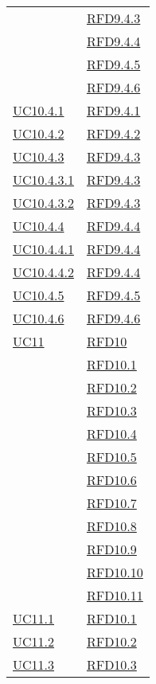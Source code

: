 \begin{longtable}{|>{\centering}m{5cm}|m{5cm}<{\centering}|}
& \hyperlink{RFD9.4.3}{RFD9.4.3}\\
& \hyperlink{RFD9.4.4}{RFD9.4.4}\\
& \hyperlink{RFD9.4.5}{RFD9.4.5}\\
& \hyperlink{RFD9.4.6}{RFD9.4.6}\\ \hline
\hyperref[UC10.4.1]{UC10.4.1} & \hyperlink{RFD9.4.1}{RFD9.4.1}\\ \hline
\hyperref[UC10.4.2]{UC10.4.2} & \hyperlink{RFD9.4.2}{RFD9.4.2}\\ \hline
\hyperref[UC10.4.3]{UC10.4.3} & \hyperlink{RFD9.4.3}{RFD9.4.3}\\ \hline
\hyperref[UC10.4.3.1]{UC10.4.3.1} & \hyperlink{RFD9.4.3}{RFD9.4.3}\\ \hline
\hyperref[UC10.4.3.2]{UC10.4.3.2} & \hyperlink{RFD9.4.3}{RFD9.4.3}\\ \hline
\hyperref[UC10.4.4]{UC10.4.4} & \hyperlink{RFD9.4.4}{RFD9.4.4}\\ \hline
\hyperref[UC10.4.4.1]{UC10.4.4.1} & \hyperlink{RFD9.4.4}{RFD9.4.4}\\ \hline
\hyperref[UC10.4.4.2]{UC10.4.4.2} & \hyperlink{RFD9.4.4}{RFD9.4.4}\\ \hline
\hyperref[UC10.4.5]{UC10.4.5} & \hyperlink{RFD9.4.5}{RFD9.4.5}\\ \hline
\hyperref[UC10.4.6]{UC10.4.6} & \hyperlink{RFD9.4.6}{RFD9.4.6}\\ \hline
\hyperref[UC11]{UC11} & \hyperlink{RFD10}{RFD10}\\
& \hyperlink{RFD10.1}{RFD10.1}\\
& \hyperlink{RFD10.2}{RFD10.2}\\
& \hyperlink{RFD10.3}{RFD10.3}\\
& \hyperlink{RFD10.4}{RFD10.4}\\
& \hyperlink{RFD10.5}{RFD10.5}\\
& \hyperlink{RFD10.6}{RFD10.6}\\
& \hyperlink{RFD10.7}{RFD10.7}\\
& \hyperlink{RFD10.8}{RFD10.8}\\
& \hyperlink{RFD10.9}{RFD10.9}\\
& \hyperlink{RFD10.10}{RFD10.10}\\
& \hyperlink{RFD10.11}{RFD10.11}\\ \hline
\hyperref[UC11.1]{UC11.1} & \hyperlink{RFD10.1}{RFD10.1}\\ \hline
\hyperref[UC11.2]{UC11.2} & \hyperlink{RFD10.2}{RFD10.2}\\ \hline
\hyperref[UC11.3]{UC11.3} & \hyperlink{RFD10.3}{RFD10.3}\\ \hline

\end{longtable}
